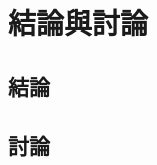 \renewcommand\thetable{\arabic{chapter}-\arabic{table}}
\chapter{結論與討論}
\label{cha:conclusions}


\section{結論}

\section{討論} 


